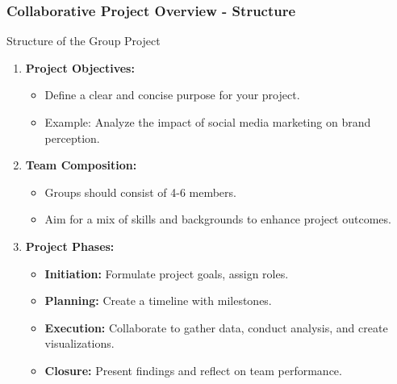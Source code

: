 \documentclass{beamer}
\begin{document}
\begin{frame}[fragile]
    \frametitle{Collaborative Project Overview - Structure}
    
    \begin{block}{Structure of the Group Project}
        \begin{enumerate}
            \item \textbf{Project Objectives:} 
            \begin{itemize}
                \item Define a clear and concise purpose for your project.
                \item Example: Analyze the impact of social media marketing on brand perception.
            \end{itemize}
            
            \item \textbf{Team Composition:}
            \begin{itemize}
                \item Groups should consist of 4-6 members.
                \item Aim for a mix of skills and backgrounds to enhance project outcomes.
            \end{itemize}
            
            \item \textbf{Project Phases:}
            \begin{itemize}
                \item \textbf{Initiation:} Formulate project goals, assign roles.
                \item \textbf{Planning:} Create a timeline with milestones.
                \item \textbf{Execution:} Collaborate to gather data, conduct analysis, and create visualizations.
                \item \textbf{Closure:} Present findings and reflect on team performance.
            \end{itemize}
        \end{enumerate}
    \end{block}
\end{frame}
\end{document}
